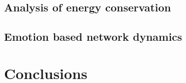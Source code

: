 \documentclass[a4,12pt]{ozu-thesis}
\begin{document}
\subsection{Analysis of energy conservation}

\subsection{Emotion based network dynamics}

\section{Conclusions}




\begin{thebibliography}{99}




\end{thebibliography}



\appendix



\begin{postliminary}
\end{postliminary}
\end{document}

